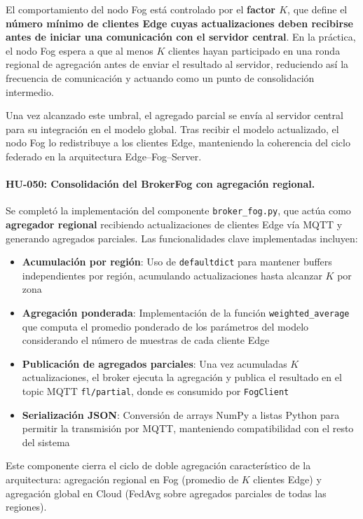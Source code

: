 \documentclass{report}
\begin{document}
El comportamiento del nodo Fog está controlado por el \textbf{factor \(K\)}, que define el \textbf{número mínimo de clientes Edge cuyas actualizaciones deben recibirse antes de iniciar una comunicación con el servidor central}. En la práctica, el nodo Fog espera a que al menos \(K\) clientes hayan participado en una ronda regional de agregación antes de enviar el resultado al servidor, reduciendo así la frecuencia de comunicación y actuando como un punto de consolidación intermedio.

Una vez alcanzado este umbral, el agregado parcial se envía al servidor central para su integración en el modelo global. Tras recibir el modelo actualizado, el nodo Fog lo redistribuye a los clientes Edge, manteniendo la coherencia del ciclo federado en la arquitectura Edge--Fog--Server.

\vspace{0.15em}
\paragraph{HU-050: Consolidación del BrokerFog con agregación regional.}
Se completó la implementación del componente \texttt{broker\_fog.py}, que actúa como \textbf{agregador regional} recibiendo actualizaciones de clientes Edge vía MQTT y generando agregados parciales. Las funcionalidades clave implementadas incluyen:

\begin{itemize}
    \item \textbf{Acumulación por región}: Uso de \texttt{defaultdict} para mantener buffers independientes por región, acumulando actualizaciones hasta alcanzar $K$ por zona
    \item \textbf{Agregación ponderada}: Implementación de la función \texttt{weighted\_average} que computa el promedio ponderado de los parámetros del modelo considerando el número de muestras de cada cliente Edge
    \item \textbf{Publicación de agregados parciales}: Una vez acumuladas $K$ actualizaciones, el broker ejecuta la agregación y publica el resultado en el topic MQTT \texttt{fl/partial}, donde es consumido por \texttt{FogClient}
    \item \textbf{Serialización JSON}: Conversión de arrays NumPy a listas Python para permitir la transmisión por MQTT, manteniendo compatibilidad con el resto del sistema
\end{itemize}

Este componente cierra el ciclo de doble agregación característico de la arquitectura: agregación regional en Fog (promedio de $K$ clientes Edge) y agregación global en Cloud (FedAvg sobre agregados parciales de todas las regiones).
\end{document}
